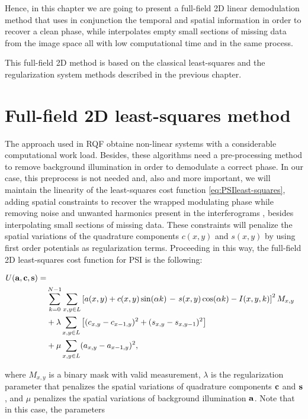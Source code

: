 Hence, in this chapter we are going to present a full-field 2D linear demodulation
method that uses in conjunction the temporal and spatial information in order
to recover a clean phase, while interpolates empty small sections of missing
data from the image space all with low computational time and in the same
process.

This full-field 2D method is based on the classical least-squares and the 
regularization system methods described in the previous chapter.

\section{Full-field 2D least-squares method}

The approach used in RQF obtaine non-linear systems with a
considerable computational work load. Besides, these algorithms need a
pre-processing method to remove background illumination in order to
demodulate a correct phase. In our case, this preprocess is not needed and, also
and more important, we will maintain the linearity of the least-squares cost
function \eqref{eq:PSIleast-squares}, adding spatial constraints to recover the
wrapped modulating phase while removing noise and unwanted harmonics present in
the interferograms \cite{RQF}, besides interpolating small sections of missing
data. These constraints will penalize the spatial variations of the quadrature
components $c(x,y)$ and $s(x,y)$ by using first order potentials as
regularization terms. Proceeding in this way, the full-field 2D
least-squares cost function for PSI is the following:
\begin{small}
\begin{align}
  U(\bf{a,c,s})=\nonumber\\
  &\sum_{k=0}^{N-1} \sum_{x,y\in L} \left[a(x,y) + 
  c(x,y)\sin(\alpha k)\right.
  -\left. s(x,y)\cos(\alpha k)-I(x,y,k) \right]^2 M_{x,y}\nonumber \\
  &+\lambda\sum_{x,y\in L}
  \left[(c_{x,y}-c_{x-1,y})^2+(s_{x,y}-s_{x,y-1})^2\right]
  \nonumber\\
  &+\mu\sum_{x,y\in L}(a_{x,y}-a_{x-1,y})^2,
  \label{eq:psi regularized}
\end{align}
\end{small}
where $M_{x,y}$ is a binary mask with valid measurement, $\lambda$ is the
regularization parameter that penalizes the spatial variations of quadrature
components $\bf c$ and $\bf s$, and $\mu$ penalizes the spatial variations of
background illumination $\bf a$. Note that in this case, the parameters
